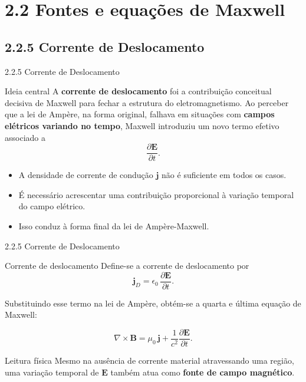 \documentclass[aspectratio=169]{beamer}
\begin{document}

\section{2.2 Fontes e equações de Maxwell}
\subsection{2.2.5 Corrente de Deslocamento}

\begin{frame}{2.2.5 Corrente de Deslocamento}
\begin{block}{Ideia central}
A \textbf{corrente de deslocamento} foi a contribuição conceitual decisiva de Maxwell para fechar a estrutura do eletromagnetismo.  
Ao perceber que a lei de Ampère, na forma original, falhava em situações com \textbf{campos elétricos variando no tempo}, Maxwell introduziu um novo termo efetivo associado a
\[
\frac{\partial \mathbf{E}}{\partial t}.
\]
\end{block}

\vspace{0.3cm}

\begin{itemize}
\item A densidade de corrente de condução \(\mathbf{j}\) não é suficiente em todos os casos.
\item É necessário acrescentar uma contribuição proporcional à variação temporal do campo elétrico.
\item Isso conduz à forma final da lei de Ampère-Maxwell.
\end{itemize}
\end{frame}

\begin{frame}{2.2.5 Corrente de Deslocamento}
\begin{alertblock}{Corrente de deslocamento}
Define-se a corrente de deslocamento por
\[
\mathbf{j}_D=\epsilon_0\,\frac{\partial \mathbf{E}}{\partial t}.
\]
\end{alertblock}

\vspace{0.2cm}

Substituindo esse termo na lei de Ampère, obtém-se a quarta e última equação de Maxwell:

\begin{equation}
\nabla\times\mathbf{B}
=
\mu_0\,\mathbf{j}
+
\frac{1}{c^2}\frac{\partial \mathbf{E}}{\partial t}.
\tag{2.32}
\label{eq:ampere-maxwell-232}
\end{equation}

\begin{block}{Leitura física}
Mesmo na ausência de corrente material atravessando uma região, uma variação temporal de \(\mathbf{E}\) também atua como \textbf{fonte de campo magnético}.
\end{block}
\end{frame}
\end{document}
